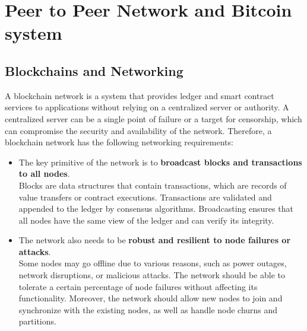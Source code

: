 \chapter{Peer to Peer Network and Bitcoin system}
\section{Blockchains and Networking}
A blockchain network is a system that provides ledger and smart contract services to applications without relying on a centralized server or authority. A centralized server can be a single point of failure or a target for censorship, which can compromise the security and availability of the network. Therefore, a blockchain network has the following networking requirements:
\begin{itemize}
	\item 
	The key primitive of the network is to \textbf{broadcast blocks and transactions to all nodes}.\\ Blocks are data structures that contain transactions, which are records of value transfers or contract executions. Transactions are validated and appended to the ledger by consensus algorithms. Broadcasting ensures that all nodes have the same view of the ledger and can verify its integrity.
	\item 
	The network also needs to be \textbf{robust and resilient to node failures or attacks}. \\ Some nodes may go offline due to various reasons, such as power outages, network disruptions, or malicious attacks. The network should be able to tolerate a certain percentage of node failures without affecting its functionality. Moreover, the network should allow new nodes to join and synchronize with the existing nodes, as well as handle node churns and partitions.
\end{itemize}
